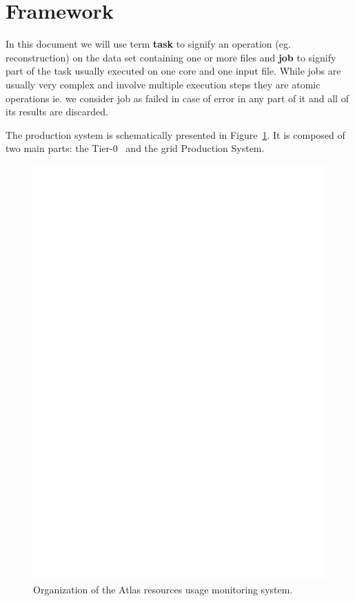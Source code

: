 \documentclass[a4paper]{jpconf}
\begin{document}
\section{Framework}


In this document we will use term {\bf task} to signify an operation (eg. reconstruction) on the data set containing one or more files and {\bf job} to signify part of the task usually executed on one core and one input file. While jobs are usually very complex and involve multiple execution steps they are atomic operations ie. we consider job as failed in case of error in any part of it and all of its results are discarded.

The production system is schematically presented in Figure~\ref{fig:sysschema}. It is composed of two main parts: the Tier-0~\cite{tier0} and the grid Production System.

\begin{figure}
  \centering
  \includegraphics[scale=0.6]{sysschema.eps}
  \caption{Organization of the Atlas resources usage monitoring system.}
  \label{fig:sysschema}
\end{figure}
\end{document}
